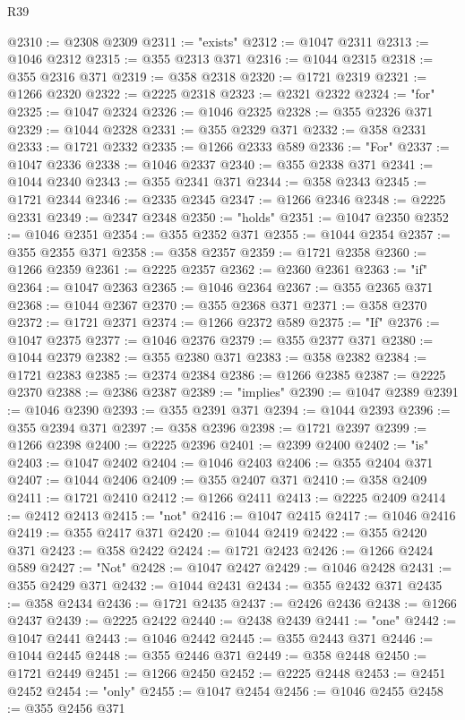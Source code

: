 \begin{lexlean}{R39}
\begin{coremodule}
@2310 := @2308 @2309
@2311 := "exists"
@2312 := @1047 @2311
@2313 := @1046 @2312
@2315 := @355 @2313 @371
@2316 := @1044 @2315
@2318 := @355 @2316 @371
@2319 := @358 @2318
@2320 := @1721 @2319
@2321 := @1266 @2320
@2322 := @2225 @2318
@2323 := @2321 @2322
@2324 := "for"
@2325 := @1047 @2324
@2326 := @1046 @2325
@2328 := @355 @2326 @371
@2329 := @1044 @2328
@2331 := @355 @2329 @371
@2332 := @358 @2331
@2333 := @1721 @2332
@2335 := @1266 @2333 @589
@2336 := "For"
@2337 := @1047 @2336
@2338 := @1046 @2337
@2340 := @355 @2338 @371
@2341 := @1044 @2340
@2343 := @355 @2341 @371
@2344 := @358 @2343
@2345 := @1721 @2344
@2346 := @2335 @2345
@2347 := @1266 @2346
@2348 := @2225 @2331
@2349 := @2347 @2348
@2350 := "holds"
@2351 := @1047 @2350
@2352 := @1046 @2351
@2354 := @355 @2352 @371
@2355 := @1044 @2354
@2357 := @355 @2355 @371
@2358 := @358 @2357
@2359 := @1721 @2358
@2360 := @1266 @2359
@2361 := @2225 @2357
@2362 := @2360 @2361
@2363 := "if"
@2364 := @1047 @2363
@2365 := @1046 @2364
@2367 := @355 @2365 @371
@2368 := @1044 @2367
@2370 := @355 @2368 @371
@2371 := @358 @2370
@2372 := @1721 @2371
@2374 := @1266 @2372 @589
@2375 := "If"
@2376 := @1047 @2375
@2377 := @1046 @2376
@2379 := @355 @2377 @371
@2380 := @1044 @2379
@2382 := @355 @2380 @371
@2383 := @358 @2382
@2384 := @1721 @2383
@2385 := @2374 @2384
@2386 := @1266 @2385
@2387 := @2225 @2370
@2388 := @2386 @2387
@2389 := "implies"
@2390 := @1047 @2389
@2391 := @1046 @2390
@2393 := @355 @2391 @371
@2394 := @1044 @2393
@2396 := @355 @2394 @371
@2397 := @358 @2396
@2398 := @1721 @2397
@2399 := @1266 @2398
@2400 := @2225 @2396
@2401 := @2399 @2400
@2402 := "is"
@2403 := @1047 @2402
@2404 := @1046 @2403
@2406 := @355 @2404 @371
@2407 := @1044 @2406
@2409 := @355 @2407 @371
@2410 := @358 @2409
@2411 := @1721 @2410
@2412 := @1266 @2411
@2413 := @2225 @2409
@2414 := @2412 @2413
@2415 := "not"
@2416 := @1047 @2415
@2417 := @1046 @2416
@2419 := @355 @2417 @371
@2420 := @1044 @2419
@2422 := @355 @2420 @371
@2423 := @358 @2422
@2424 := @1721 @2423
@2426 := @1266 @2424 @589
@2427 := "Not"
@2428 := @1047 @2427
@2429 := @1046 @2428
@2431 := @355 @2429 @371
@2432 := @1044 @2431
@2434 := @355 @2432 @371
@2435 := @358 @2434
@2436 := @1721 @2435
@2437 := @2426 @2436
@2438 := @1266 @2437
@2439 := @2225 @2422
@2440 := @2438 @2439
@2441 := "one"
@2442 := @1047 @2441
@2443 := @1046 @2442
@2445 := @355 @2443 @371
@2446 := @1044 @2445
@2448 := @355 @2446 @371
@2449 := @358 @2448
@2450 := @1721 @2449
@2451 := @1266 @2450
@2452 := @2225 @2448
@2453 := @2451 @2452
@2454 := "only"
@2455 := @1047 @2454
@2456 := @1046 @2455
@2458 := @355 @2456 @371

\end{coremodule}
\end{lexlean}
